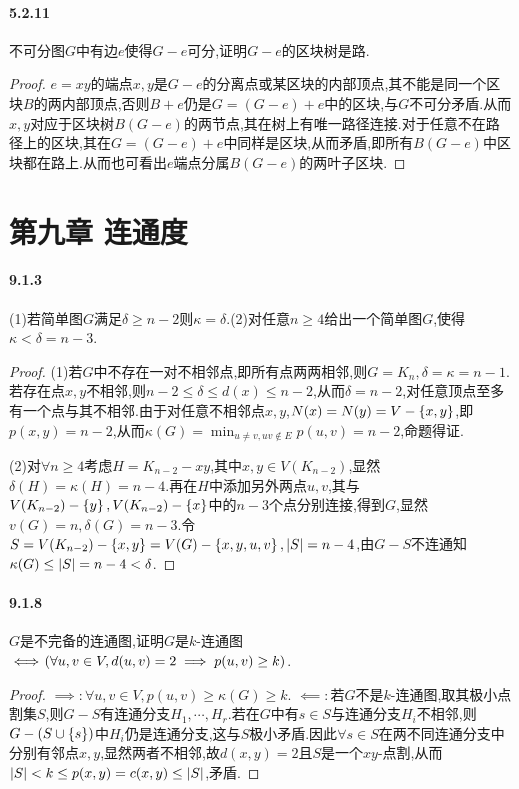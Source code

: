 \documentclass[11pt]{article}
\begin{document}
\paragraph{5.2.11}不可分图$G$中有边$e$使得$G-e$可分,证明$G-e$的区块树是路.
\begin{proof}
$e=xy$的端点$x,y$是$G-e$的分离点或某区块的内部顶点,其不能是同一个区块$B$的两内部顶点,否则$B+e$仍是$G=(G-e)+e$中的区块,与$G$不可分矛盾.从而$x,y$对应于区块树$B(G-e)$的两节点,其在树上有唯一路径连接.对于任意不在路径上的区块,其在$G=(G-e)+e$中同样是区块,从而矛盾,即所有$B(G-e)$中区块都在路上.从而也可看出$e$端点分属$B(G-e)$的两叶子区块.
\end{proof}

\section{第九章\; 连通度}
\paragraph{9.1.3}(1)若简单图$G$满足$\delta\geq n-2$则$\kappa=\delta$.(2)对任意$n\geq 4$给出一个简单图$G$,使得$\kappa<\delta=n-3$.
\begin{proof}
    (1)若$G$中不存在一对不相邻点,即所有点两两相邻,则$G=K_n, \delta=\kappa=n-1$.若存在点$x,y$不相邻,则$n-2\leq\delta\leq d(x)\leq n-2$,从而$\delta=n-2$,对任意顶点至多有一个点与其不相邻.由于对任意不相邻点$x,y$,$N(x)=N(y)=V-\left\{x,y\right\}$,即$p(x,y)=n-2$,从而$\kappa(G)=\min_{u\neq v, uv\notin E}p(u,v)=n-2$,命题得证.

    (2)对$\forall n\geq 4$考虑$H=K_{n-2}-xy$,其中$x,y\in V(K_{n-2})$,显然$\delta(H)=\kappa(H)=n-4$.再在$H$中添加另外两点$u,v$,其与$V(K_{n-2})-\left\{y\right\}, V(K_{n-2})-\left\{x\right\}$中的$n-3$个点分别连接,得到$G$,显然$v(G)=n, \delta(G)=n-3$.令$S=V(K_{n-2})-\left\{x,y\right\}=V(G)-\left\{x,y,u,v\right\},\left|S\right|=n-4$,由$G-S$不连通知$\kappa(G)\leq \left|S\right|=n-4<\delta$.
\end{proof}

\paragraph{9.1.8}$G$是不完备的连通图,证明$G$是$k$-连通图$\iff \!\left(\forall u,v\in V, d(u,v)=2\implies p(u,v)\geq k\right)$.
\begin{proof}
    $\implies: \forall u,v\in V, p(u,v)\geq \kappa(G)\geq k$. $\impliedby:$若$G$不是$k$-连通图,取其极小点割集$S$,则$G-S$有连通分支$H_1,\cdots,H_r$.若在$G$中有$s\in S$与连通分支$H_i$不相邻,则$G-(S\cup\left\{s\right\})$中$H_i$仍是连通分支,这与$S$极小矛盾.因此$\forall s\in S$在两不同连通分支中分别有邻点$x,y$,显然两者不相邻,故$d(x,y)=2$且$S$是一个$xy$-点割,从而$\left|S\right|<k\leq p(x,y)=c(x,y)\leq \left|S\right|$,矛盾.
\end{proof}
\end{document}

